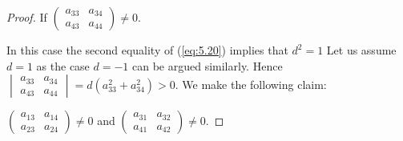 \documentclass{amsart}
\numberwithin{equation}{section}
\theoremstyle{definition}
\renewcommand{\1}{\mathds{1}}
\renewcommand{\>}{\rightarrow}
\begin{document}
\begin{proof}
 If $\begin{pmatrix}a_{33} & a_{34} \\ a_{43} & a_{44} \end{pmatrix} \neq 0$.

In this case the second equality of (\ref{eq:5.20}) implies that $d^2=1$
Let us assume $d=1$ as the case $d=-1$ can be argued similarly. Hence $\begin{vmatrix}a_{33} & a_{34} \\ a_{43} & a_{44} \end{vmatrix} = d(a_{33}^2+a_{34}^2)>0$. We make the following claim:
\vspace{0.2cm}

  $\begin{pmatrix}a_{13} & a_{14} \\ a_{23} & a_{24} \end{pmatrix} \neq 0$
and $\begin{pmatrix}a_{31} & a_{32} \\ a_{41} & a_{42} \end{pmatrix} \neq 0$.


\end{proof}
\end{document}

